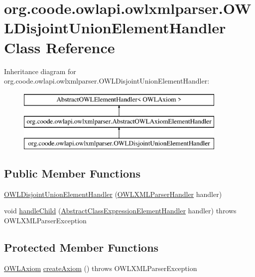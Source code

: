 \hypertarget{classorg_1_1coode_1_1owlapi_1_1owlxmlparser_1_1_o_w_l_disjoint_union_element_handler}{\section{org.\-coode.\-owlapi.\-owlxmlparser.\-O\-W\-L\-Disjoint\-Union\-Element\-Handler Class Reference}
\label{classorg_1_1coode_1_1owlapi_1_1owlxmlparser_1_1_o_w_l_disjoint_union_element_handler}
}
Inheritance diagram for org.\-coode.\-owlapi.\-owlxmlparser.\-O\-W\-L\-Disjoint\-Union\-Element\-Handler\-:\begin{figure}[H]
\begin{center}
\leavevmode
\includegraphics[height=3.000000cm]{classorg_1_1coode_1_1owlapi_1_1owlxmlparser_1_1_o_w_l_disjoint_union_element_handler}
\end{center}
\end{figure}
\subsection*{Public Member Functions}
\begin{DoxyCompactItemize}
\item 
\hyperlink{classorg_1_1coode_1_1owlapi_1_1owlxmlparser_1_1_o_w_l_disjoint_union_element_handler_a0f7c732f17e6df936b9657003e87e540}{O\-W\-L\-Disjoint\-Union\-Element\-Handler} (\hyperlink{classorg_1_1coode_1_1owlapi_1_1owlxmlparser_1_1_o_w_l_x_m_l_parser_handler}{O\-W\-L\-X\-M\-L\-Parser\-Handler} handler)
\item 
void \hyperlink{classorg_1_1coode_1_1owlapi_1_1owlxmlparser_1_1_o_w_l_disjoint_union_element_handler_aa6565bb1cf8713e6c91f8e941b87d3b9}{handle\-Child} (\hyperlink{classorg_1_1coode_1_1owlapi_1_1owlxmlparser_1_1_abstract_class_expression_element_handler}{Abstract\-Class\-Expression\-Element\-Handler} handler)  throws O\-W\-L\-X\-M\-L\-Parser\-Exception 
\end{DoxyCompactItemize}
\subsection*{Protected Member Functions}
\begin{DoxyCompactItemize}
\item 
\hyperlink{interfaceorg_1_1semanticweb_1_1owlapi_1_1model_1_1_o_w_l_axiom}{O\-W\-L\-Axiom} \hyperlink{classorg_1_1coode_1_1owlapi_1_1owlxmlparser_1_1_o_w_l_disjoint_union_element_handler_a43525328fb1055656efd9332b7b2bdce}{create\-Axiom} ()  throws O\-W\-L\-X\-M\-L\-Parser\-Exception 
\end{DoxyCompactItemize}

